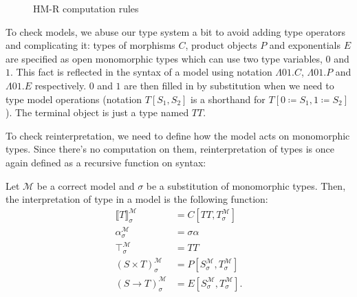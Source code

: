 \begin{figure}
\centering
{}
\caption{HM-R computation rules}
\Description{}
\label{hm-r-comp}
\end{figure}

To check models, we abuse our type system a bit 
to avoid adding type operators and complicating it:
types of morphisms $C$, product objects $P$ and
exponentials $E$ are specified as open monomorphic types
which can use two type variables, $0$ and $1$. This fact
is reflected in the syntax of a model using notation
$\Lambda 01.C$, $\Lambda 01.P$ and $\Lambda 01.E$
respectively. $0$ and $1$ are then filled in by
substitution when we need to type model operations
(notation $T[S_1, S_2]$ is a shorthand for
$T[0\coloneqq S_1,1\coloneqq S_2]$). The terminal object is
just a type named $TT$.

To check reinterpretation, we need to define how the model
acts on monomorphic types. Since there's no computation
on them, reinterpretation of types is once again defined
as a recursive function on syntax:

\begin{definition}
    Let $\mathcal{M}$ be a correct model and $\sigma$ be
    a substitution of monomorphic types. Then, the
    interpretation of type in a model is the following
    function:
    \begin{align}{}
    \llbracket T\rrbracket^\mathcal{M}_\sigma &=
        C[TT,T^\mathcal{M}_\sigma] \\
    \alpha^\mathcal{M}_\sigma &= \sigma\alpha \\
    \top^\mathcal{M}_\sigma &= TT \\
    (S\times T)^\mathcal{M}_\sigma &=
        P[S^\mathcal{M}_\sigma,T^\mathcal{M}_\sigma] \\
    (S\to T)^\mathcal{M}_\sigma &=
        E[S^\mathcal{M}_\sigma,T^\mathcal{M}_\sigma].
    \end{align}
\end{definition}


